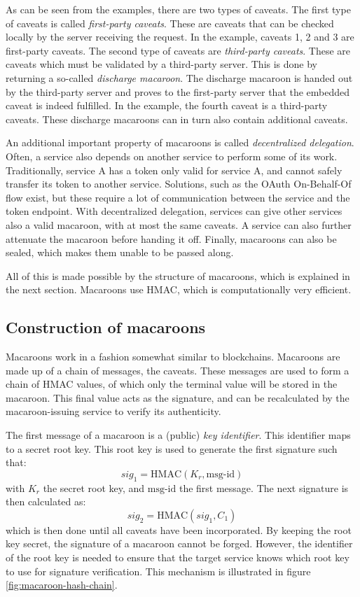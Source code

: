 As can be seen from the examples, there are two types of caveats. The first type of caveats is called \textit{first-party caveats}. These are caveats that can be checked locally by the server receiving the request. In the example, caveats 1, 2 and 3 are first-party caveats. 
The second type of caveats are \textit{third-party caveats}. These are caveats which must be validated by a third-party server. This is done by returning a so-called \textit{discharge macaroon}. The discharge macaroon is handed out by the third-party server and proves to the first-party server that the embedded caveat is indeed fulfilled. In the example, the fourth caveat is a third-party caveats. These discharge macaroons can in turn also contain additional caveats.

An additional important property of macaroons is called \textit{decentralized delegation}. Often, a service also depends on another service to perform some of its work. Traditionally, service A has a token only valid for service A, and cannot safely transfer its token to another service. Solutions, such as the OAuth On-Behalf-Of flow exist, but these require a lot of communication between the service and the token endpoint. With decentralized delegation, services can give other services also a valid macaroon, with at most the same caveats. A service can also further attenuate the macaroon before handing it off. Finally, macaroons can also be sealed, which makes them unable to be passed along. 

All of this is made possible by the structure of macaroons, which is explained in the next section. Macaroons use \gls{HMAC}, which is computationally very efficient.

\subsection{Construction of macaroons}
Macaroons work in a fashion somewhat similar to blockchains. Macaroons are made up of a chain of messages, the caveats. These messages are used to form a chain of \gls{HMAC} values, of which only the terminal value will be stored in the macaroon. This final value acts as the signature, and can be recalculated by the macaroon-issuing service to verify its authenticity. 

The first message of a macaroon is a (public) \textit{key identifier}. This identifier maps to a secret root key. This root key is used to generate the first signature such that: $$sig_1 = \text{HMAC}(K_r, \text{msg-id})$$
with $K_r$ the secret root key, and $\text{msg-id}$ the first message. The next signature is then calculated as: $$sig_2 = \text{HMAC}(sig_1, C_1)$$
which is then done until all caveats have been incorporated. By keeping the root key secret, the signature of a macaroon cannot be forged. However, the identifier of the root key is needed to ensure that the target service knows which root key to use for signature verification. This mechanism is illustrated in figure \ref{fig:macaroon-hash-chain}.

